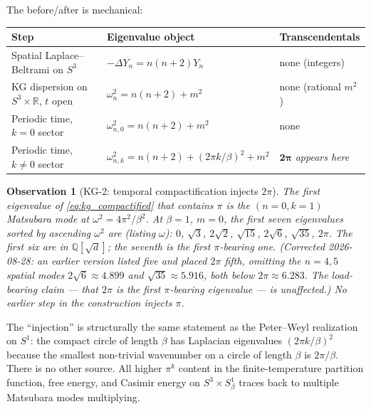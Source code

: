 \documentclass[11pt]{article}
\newtheorem{observation}{Observation}
\begin{document}
The before/after is mechanical:

\begin{center}
\small
\begin{tabular}{p{4cm} p{4cm} p{3cm}}
\toprule
Step & Eigenvalue object & Transcendentals \\
\midrule
Spatial Laplace--Beltrami on $S^3$ &
$-\Delta Y_n = n(n+2) Y_n$ & none (integers) \\
KG dispersion on $S^3 \times \mathbb{R}$, $t$ open &
$\omega_n^2 = n(n+2) + m^2$ & none (rational $m^2$) \\
Periodic time, $k = 0$ sector &
$\omega_{n,0}^2 = n(n+2) + m^2$ & none \\
Periodic time, $k \neq 0$ sector &
$\omega_{n,k}^2 = n(n+2) + (2\pi k/\beta)^2 + m^2$ &
$\boldsymbol{2\pi}$ \emph{appears here} \\
\bottomrule
\end{tabular}
\end{center}

\begin{observation}[KG-2: temporal compactification injects $2\pi$]
\label{obs:where_pi}
The first eigenvalue of \eqref{eq:kg_compactified} that contains $\pi$
is the $(n {=} 0, k {=} 1)$ Matsubara mode at $\omega^2 = 4\pi^2 / \beta^2$.
At $\beta = 1$, $m = 0$, the first seven eigenvalues sorted by
ascending $\omega^2$ are (listing $\omega$): $0$, $\sqrt{3}$, $2\sqrt{2}$, $\sqrt{15}$,
$2\sqrt{6}$, $\sqrt{35}$, $2\pi$.  The first six are in
$\mathbb{Q}[\sqrt{d}]$; the seventh is the first $\pi$-bearing one.
(Corrected 2026-08-28: an earlier version listed five and placed
$2\pi$ fifth, omitting the $n=4,5$ spatial modes $2\sqrt{6} \approx
4.899$ and $\sqrt{35} \approx 5.916$, both below $2\pi \approx 6.283$.
The load-bearing claim --- that $2\pi$ is the \emph{first}
$\pi$-bearing eigenvalue --- is unaffected.)  No earlier step in the construction injects $\pi$.
\end{observation}

The ``injection'' is structurally the same statement as the
Peter--Weyl realization on $S^1$: the compact circle of length $\beta$
has Laplacian eigenvalues $(2\pi k / \beta)^2$ because the smallest
non-trivial wavenumber on a circle of length $\beta$ is $2\pi / \beta$.
There is no other source.  All higher $\pi^k$ content in the
finite-temperature partition function, free energy, and Casimir energy
on $S^3 \times S^1_\beta$ traces back to multiple Matsubara modes
multiplying.

\end{document}
